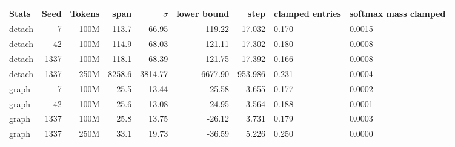 \begin{tabular}{@{}lrrrrrrp{1.3cm}p{1.5cm}@{}}
\toprule
Stats & Seed & Tokens & span & $\sigma$ & lower bound & step & clamped entries & softmax mass clamped \\
\midrule
detach & 7 & 100M & 113.7 & 66.95 & -119.22 & 17.032 & 0.170 & 0.0015 \\
detach & 42 & 100M & 114.9 & 68.03 & -121.11 & 17.302 & 0.180 & 0.0008 \\
detach & 1337 & 100M & 118.1 & 68.39 & -121.75 & 17.392 & 0.166 & 0.0008 \\
detach & 1337 & 250M & 8258.6 & 3814.77 & -6677.90 & 953.986 & 0.231 & 0.0004 \\
graph & 7 & 100M & 25.5 & 13.44 & -25.58 & 3.655 & 0.177 & 0.0002 \\
graph & 42 & 100M & 25.6 & 13.08 & -24.95 & 3.564 & 0.188 & 0.0001 \\
graph & 1337 & 100M & 25.8 & 13.75 & -26.12 & 3.731 & 0.179 & 0.0003 \\
graph & 1337 & 250M & 33.1 & 19.73 & -36.59 & 5.226 & 0.250 & 0.0000 \\
\bottomrule
\end{tabular}
